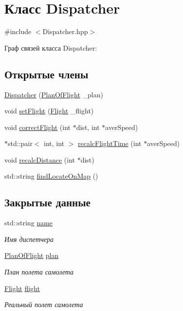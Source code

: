 \hypertarget{class_dispatcher}{}\section{Класс Dispatcher}
\label{class_dispatcher}


{\ttfamily \#include $<$Dispatcher.\+hpp$>$}



Граф связей класса Dispatcher\+:
\subsection*{Открытые члены}
\begin{DoxyCompactItemize}
\item 
\hyperlink{class_dispatcher_ad71822672a921992d4f692290f04256e}{Dispatcher} (\hyperlink{class_plan_of_flight}{Plan\+Of\+Flight} \+\_\+plan)
\item 
void \hyperlink{class_dispatcher_a68ff23b5fc803c57bf77edee96ff1cba}{set\+Flight} (\hyperlink{class_flight}{Flight} \+\_\+flight)
\item 
void \hyperlink{class_dispatcher_a9d216113c779acef564d31da797cdaae}{correct\+Flight} (int $\ast$dist, int $\ast$aver\+Speed)
\item 
$\ast$std\+::pair$<$ int, int $>$ \hyperlink{class_dispatcher_a7634fa3cbe643d23e029add4319df59d}{recalc\+Flight\+Time} (int $\ast$aver\+Speed)
\item 
void \hyperlink{class_dispatcher_ae676aefe97ae29d1437a7d83cb926492}{recalc\+Distance} (int $\ast$dist)
\item 
std\+::string \hyperlink{class_dispatcher_a9b524370974d61389e698f7b0a21473f}{find\+Locate\+On\+Map} ()
\end{DoxyCompactItemize}
\subsection*{Закрытые данные}
\begin{DoxyCompactItemize}
\item 
std\+::string \hyperlink{class_dispatcher_aa0667608304c6859a6dea2f16d8b56e7}{name}
\begin{DoxyCompactList}\small\item\em Имя диспетчера \end{DoxyCompactList}\item 
\hyperlink{class_plan_of_flight}{Plan\+Of\+Flight} \hyperlink{class_dispatcher_acd061344a58a854e72c08712e9ef8b7e}{plan}
\begin{DoxyCompactList}\small\item\em План полета самолета \end{DoxyCompactList}\item 
\hyperlink{class_flight}{Flight} \hyperlink{class_dispatcher_a8bc2b0350eb8323fc04d1af3c0c61585}{flight}
\begin{DoxyCompactList}\small\item\em Реальный полет самолета \end{DoxyCompactList}\end{DoxyCompactItemize}



